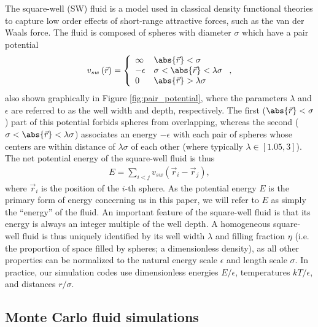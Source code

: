 \documentclass[11pt]{article}
\newcommand{\p}[1]{\left(#1\right)} %
\renewcommand{\sp}[1]{\left[#1\right]} %
\begin{document}
The square-well (SW) fluid is a model used in classical density
functional theories to capture low order effects of short-range
attractive forces, such as the van der Waals force. The fluid is
composed of spheres with diameter $\sigma$ which have a pair potential
\begin{align}
  v_{sw}\p{\vec r}=\left\{
    \begin{array}{ll}
      \infty & \abs{\vec r}<\sigma \\
      -\epsilon & \sigma<\abs{\vec r}<\lambda\sigma \\
      0 & \abs{\vec r}>\lambda\sigma
    \end{array}
  \right., \label{eq:pair_potential}
\end{align}
also shown graphically in Figure \ref{fig:pair_potential}, where the
parameters $\lambda$ and $\epsilon$ are referred to as the well width
and depth, respectively. The first ($\abs{\vec r}<\sigma$) part of
this potential forbids spheres from overlapping, whereas the second
($\sigma<\abs{\vec r}<\lambda\sigma$) associates an energy $-\epsilon$
with each pair of spheres whose centers are within distance of
$\lambda\sigma$ of each other (where typically
$\lambda\in\sp{1.05,3}$). The net potential energy of the square-well
fluid is thus
\begin{align}
  E=\sum_{i<j}v_{sw}\p{\vec r_i-\vec r_j},
  \label{eq:internal_energy}
\end{align}
where $\vec r_i$ is the position of the $i$-th sphere. As the
potential energy $E$ is the primary form of energy concerning us in
this paper, we will refer to $E$ as simply the ``energy'' of the
fluid. An important feature of the square-well fluid is that its
energy is always an integer multiple of the well depth. A homogeneous
square-well fluid is thus uniquely identified by its well width
$\lambda$ and filling fraction $\eta$ (i.e. the proportion of space
filled by spheres; a dimensionless density), as all other properties
can be normalized to the natural energy scale $\epsilon$ and length
scale $\sigma$. In practice, our simulation codes use dimensionless
energies $E/\epsilon$, temperatures $kT/\epsilon$, and distances
$r/\sigma$.

\subsection{Monte Carlo fluid simulations}
\label{sec:MC_simulations}
\end{document}
